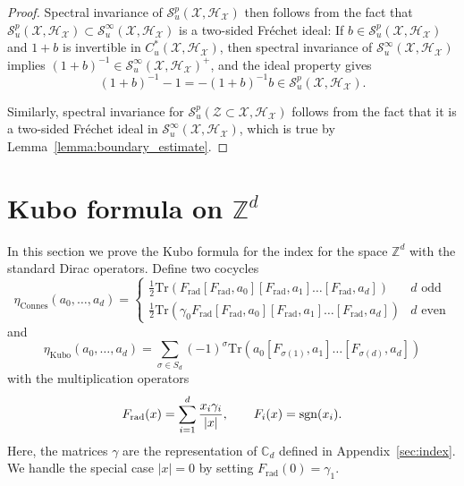 \documentclass[12pt]{amsart}
\newcommand{\CM}{{\mathbb C}}
\newcommand{\ZM}{{\mathbb Z}}
\newcommand{\Ss}{{\mathcal S}}
\newcommand{\Hh}{{\mathcal H}}
\newcommand{\Xx}{{\mathcal X}}
\newcommand{\Zz}{{\mathcal Z}}
\newcommand{\sgn}{{\rm sgn}}
\begin{document}
\begin{proof}
Spectral invariance of $\Ss^p_u(\Xx,\Hh_\Xx)$ then follows from the fact that $\Ss^p_u(\Xx,\Hh_\Xx)\subset \Ss^\infty_u(\Xx,\Hh_\Xx)$ is a two-sided Fr\'echet ideal: If $b \in \Ss_u^p(\Xx, \Hh_\Xx)$ and $1+b$ is invertible in $C^*_u(\Xx, \Hh_\Xx)$, then spectral invariance of $\Ss^\infty_u(\Xx, \Hh_\Xx)$ implies $(1+b)^{-1}\in \Ss^\infty_u(\Xx, \Hh_\Xx)^+$, and the ideal property gives
\[(1+b)^{-1} - 1 = -(1+b)^{-1} b \in \Ss^p_u(\Xx, \Hh_\Xx).\]

Similarly, spectral invariance for $\Ss^p_u(\Zz\subset\Xx, \Hh_\Xx)$ follows from the fact that it is a two-sided Fr\'echet ideal in $\Ss^\infty_u(\Xx, \Hh_\Xx)$, which is true by Lemma~\ref{lemma:boundary_estimate}. 
\end{proof}



\section{Kubo formula on \texorpdfstring{$\ZM^d$}{Z\textasciicircum d}}
\label{sec:kubozd}
In this section we prove the Kubo formula for the index for the space $\ZM^d$ with the standard Dirac operators. Define two cocycles
$$\eta_{\mathrm{Connes}}(a_0,\dots,a_d)= \begin{cases}  \frac12 \mathrm{Tr}(F_{\mathrm{rad}}[F_{\mathrm{rad}},a_0] [F_{\mathrm{rad}}, a_1]\dots[F_{\mathrm{rad}},a_d])  & d\text{ odd}\\
\frac12\mathrm{Tr}(\gamma_0 F_{\mathrm{rad}} [F_{\mathrm{rad}},a_0] [F_{\mathrm{rad}}, a_1]\dots[F_{\mathrm{rad}},a_d])  & d\text{ even}
\end{cases}
$$
and
$$\eta_{\mathrm{Kubo}}(a_0,\dots,a_d)= \sum_{\sigma\in S_d} (-1)^\sigma \mathrm{Tr}(a_0 [F_{\sigma(1)}, a_1]\dots[F_{\sigma(d)},a_d])$$
with the multiplication operators
$$F_{\mathrm{rad}}(x)= \sum_{i=1}^d \frac{x_i \gamma_i}{|x|}, \qquad F_i(x) = \sgn(x_i).$$
Here, the matrices $\gamma$ are the representation of $\CM_d$ defined in Appendix~\ref{sec:index}. We handle the special case $|x|=0$ by setting $F_{\mathrm{rad}}(0)=\gamma_1$.
\end{document}
